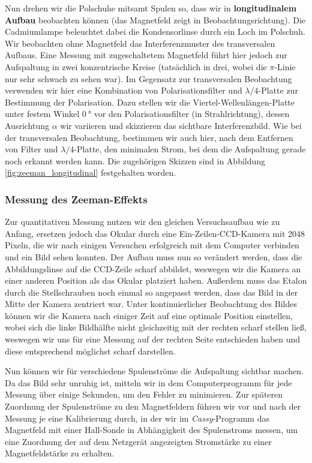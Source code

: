 \documentclass[11pt, a4paper]{article}
\begin{document}
Nun drehen wir die Polschuhe mitsamt Spulen so, dass wir in \textbf{longitudinalem Aufbau} beobachten können (das Magnetfeld zeigt in Beobachtungsrichtung).
Die Cadmiumlampe beleuchtet dabei die Kondensorlinse durch ein Loch im Polschuh.
Wir beobachten ohne Magnetfeld das Interferenzmuster des transversalen Aufbaus.
Eine Messung mit zugeschaltetem Magnetfeld führt hier jedoch zur Aufspaltung in zwei konzentrische Kreise (tatsächlich in drei, wobei die $\pi$-Linie nur sehr schwach zu sehen war).
Im Gegensatz zur transversalen Beobachtung verwenden wir hier eine Kombination von Polarisationsfilter und $\lambda/4$-Platte zur Bestimmung der Polarisation.
Dazu stellen wir die Viertel-Wellenlängen-Platte unter festem Winkel $\SI{0}{\degree}$ vor den Polarisationsfilter (in Strahlrichtung), dessen Ausrichtung $\alpha$ wir variieren und skizzieren das sichtbare Interferenzbild.
Wie bei der transversalen Beobachtung, bestimmen wir auch hier, nach dem Entfernen von Filter und $\lambda/4$-Platte, den minimalen Strom, bei dem die Aufspaltung gerade noch erkannt werden kann.
Die zugehörigen Skizzen sind in Abbildung \ref{fig:zeeman_longitudinal} festgehalten worden.

\subsubsection{Messung des Zeeman-Effekts}

Zur quantitativen Messung nutzen wir den gleichen Versuchsaufbau wie zu Anfang, ersetzen jedoch das Okular durch eine Ein-Zeilen-CCD-Kamera mit 2048 Pixeln, die wir nach einigen Versuchen erfolgreich mit dem Computer verbinden und ein Bild sehen konnten.
Der Aufbau muss nun so verändert werden, dass die Abbildungslinse auf die CCD-Zeile scharf abbildet, weswegen wir die Kamera an einer anderen Position als das Okular platziert haben.
Außerdem muss das Etalon durch die Stellschrauben noch einmal so angepasst werden, dass das Bild in der Mitte der Kamera zentriert war.
Unter kontinuierlicher Beobachtung des Bildes können wir die Kamera nach einiger Zeit auf eine optimale Position einstellen, wobei sich die linke Bildhälfte nicht gleichzeitig mit der rechten scharf stellen ließ, weswegen wir uns für eine Messung auf der rechten Seite entschieden haben und diese entsprechend möglichst scharf darstellen.

Nun können wir für verschiedene Spulenströme die Aufspaltung sichtbar machen.
Da das Bild sehr unruhig ist, mitteln wir in dem Computerprogramm für jede Messung über einige Sekunden, um den Fehler zu minimieren.
Zur späteren Zuordnung der Spulenströme zu den Magnetfeldern führen wir vor und nach der Messung je eine Kalibrierung durch, in der wir im \emph{Cassy}-Programm das Magnetfeld mit einer Hall-Sonde in Abhängigkeit des Spulenstroms messen, um eine Zuordnung der auf dem Netzgerät angezeigten Stromstärke zu einer Magnetfeldstärke zu erhalten.
\end{document}
